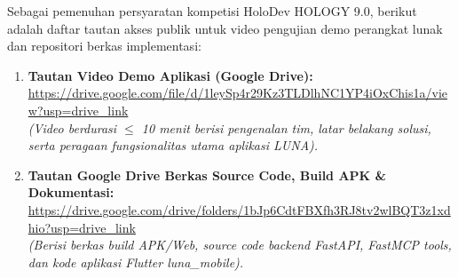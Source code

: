 \indent Sebagai pemenuhan persyaratan kompetisi HoloDev HOLOGY 9.0, berikut adalah daftar tautan akses publik untuk video pengujian demo perangkat lunak dan repositori berkas implementasi:

\begin{enumerate}[leftmargin=*,label=\arabic*.,itemsep=0.5em]
    \item \textbf{Tautan Video Demo Aplikasi (Google Drive):}\\
    \url{https://drive.google.com/file/d/1leySp4r29Kz3TLDlhNC1YP4iOxChis1a/view?usp=drive_link}\\
    {\small\itshape (Video berdurasi $\le$ 10 menit berisi pengenalan tim, latar belakang solusi, serta peragaan fungsionalitas utama aplikasi LUNA).}
    
    \item \textbf{Tautan Google Drive Berkas Source Code, Build APK \& Dokumentasi:}\\
    \url{https://drive.google.com/drive/folders/1bJp6CdtFBXfh3RJ8tv2wlBQT3z1xdhio?usp=drive_link}\\
    {\small\itshape (Berisi berkas build APK/Web, source code backend FastAPI, FastMCP tools, dan kode aplikasi Flutter luna\_mobile).}
\end{enumerate}


